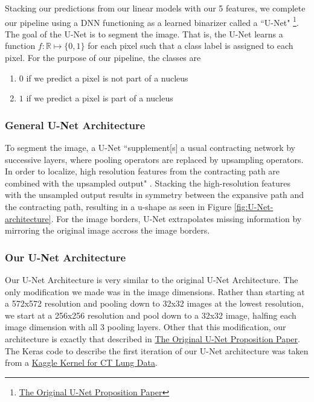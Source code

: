 \documentclass[paper=letter, fontsize=12pt]{article}
\numberwithin{equation}{section} %
\numberwithin{figure}{section} %
\numberwithin{table}{section} %
\begin{document}
Stacking our predictions from our linear models with our 5 features, we complete
our pipeline using a DNN functioning as a learned binarizer called a ``U-Net"
\footnote{\href{https://arxiv.org/pdf/1505.04597.pdf}{The Original U-Net Proposition Paper}}.
The goal of the U-Net is to segment the image. That is, the U-Net learns a function
$f : \mathbb{R} \mapsto \{0, 1\}$ for each pixel such that a class label is assigned
to each pixel. For the purpose of our pipeline, the classes are
\begin{enumerate}
  \item $0$ if we predict a pixel is not part of a nucleus
  \item $1$ if we predict a pixel is part of a nucleus
\end{enumerate}

\subsubsection{General U-Net Architecture}
To segment the image, a U-Net ``supplement[s] a usual contracting network by
successive layers, where pooling operators are replaced by upsampling
operators. In order to localize, high resolution features from the contracting
path are combined with the upsampled output" \cite{unet}. Stacking
the high-resolution features with the unsampled output results in symmetry
between the expansive path and the contracting path, resulting in a u-shape as
seen in Figure \ref{fig:U-Net-architecture}. For the image borders, U-Net
extrapolates missing information by mirroring the original image accross the
image borders.

\subsubsection{Our U-Net Architecture}
Our U-Net Architecture is very similar to the original U-Net Architecture. The
only modification we made was in the image dimensions. Rather than starting at
a 572x572 resolution and pooling down to 32x32 images at the lowest
resolution, we start at a 256x256 resolution and pool down to a 32x32 image,
halfing each image dimension with all 3 pooling layers. Other that this
modification, our architecture is exactly that described in
\href{https://arxiv.org/pdf/1505.04597.pdf}{The Original U-Net Proposition
Paper}.  The Keras code to describe the first iteration of our U-Net
architecture was taken from a
\href{https://www.kaggle.com/toregil/a-lung-u-net-in-keras}{Kaggle Kernel for
CT Lung Data}.
\end{document}
